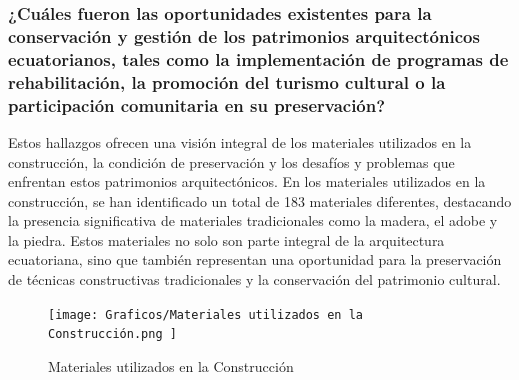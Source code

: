 \documentclass[journal,article,submit,pdftex,moreauthors]{Definitions/mdpi}
\begin{document}
\subsubsection{\textbf{¿Cuáles fueron las oportunidades existentes para la conservación y gestión de los patrimonios arquitectónicos ecuatorianos, tales como la implementación de programas de rehabilitación, la promoción del turismo cultural o la participación comunitaria en su preservación?}}\par %
Estos hallazgos ofrecen una visión integral de los materiales utilizados en la construcción, la condición de preservación y los desafíos y problemas que enfrentan estos patrimonios arquitectónicos. En los materiales utilizados en la construcción, se han identificado un total de 183 materiales diferentes, destacando la presencia significativa de materiales tradicionales como la madera, el adobe y la piedra. Estos materiales no solo son parte integral de la arquitectura ecuatoriana, sino que también representan una oportunidad para la preservación de técnicas constructivas tradicionales y la conservación del patrimonio cultural.
 \par %
  \begin{figure} [h!]
    \centering
    \texttt{[image: Graficos/Materiales utilizados en la Construcción.png ]}
    \caption{Materiales utilizados en la Construcción}
    \label{fig:grafico}
\end{figure}
 
\end{document}
